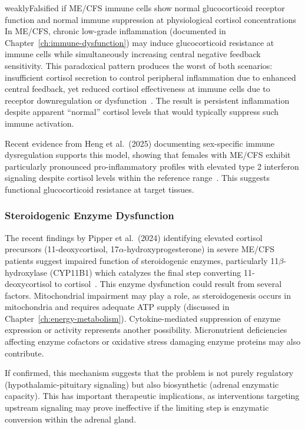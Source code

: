 \begin{fhypothesis}{weakly}{Falsified if ME/CFS immune cells show normal glucocorticoid receptor function and normal immune suppression at physiological cortisol concentrations}
\label{hyp:chronic-inflammation-hpa}
In ME/CFS, chronic low-grade inflammation (documented in Chapter~\ref{ch:immune-dysfunction}) may induce glucocorticoid resistance at immune cells while simultaneously increasing central negative feedback sensitivity. This paradoxical pattern produces the worst of both scenarios: insufficient cortisol secretion to control peripheral inflammation due to enhanced central feedback, yet reduced cortisol effectiveness at immune cells due to receptor downregulation or dysfunction~\cite{walitt2024deep,heng2025sexspecific}. The result is persistent inflammation despite apparent ``normal'' cortisol levels that would typically suppress such immune activation.
\end{fhypothesis}

Recent evidence from Heng et al.\ (2025) documenting sex-specific immune dysregulation supports this model, showing that females with ME/CFS exhibit particularly pronounced pro-inflammatory profiles with elevated type 2 interferon signaling despite cortisol levels within the reference range~\cite{heng2025sexspecific}. This suggests functional glucocorticoid resistance at target tissues.

\subsubsection{Steroidogenic Enzyme Dysfunction}

The recent findings by Pipper et al.\ (2024) identifying elevated cortisol precursors (11-deoxycortisol, 17$\alpha$-hydroxyprogesterone) in severe ME/CFS patients suggest impaired function of steroidogenic enzymes, particularly 11$\beta$-hydroxylase (CYP11B1) which catalyzes the final step converting 11-deoxycortisol to cortisol~\cite{pipper2024steroid}. This enzyme dysfunction could result from several factors. Mitochondrial impairment may play a role, as steroidogenesis occurs in mitochondria and requires adequate ATP supply (discussed in Chapter~\ref{ch:energy-metabolism}). Cytokine-mediated suppression of enzyme expression or activity represents another possibility. Micronutrient deficiencies affecting enzyme cofactors or oxidative stress damaging enzyme proteins may also contribute.

If confirmed, this mechanism suggests that the problem is not purely regulatory (hypothalamic-pituitary signaling) but also biosynthetic (adrenal enzymatic capacity). This has important therapeutic implications, as interventions targeting upstream signaling may prove ineffective if the limiting step is enzymatic conversion within the adrenal gland.

